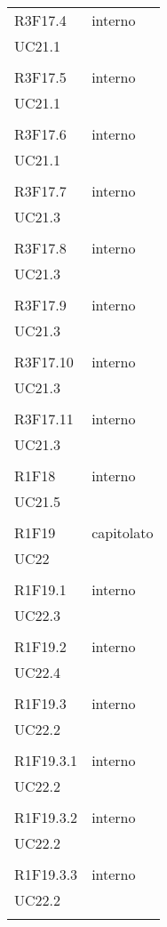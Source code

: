 \begin{longtable}{ >{\centering}p{}
		>{\centering}p{}}
	R3F17.4 & interno\\UC21.1\\\tabularnewline
	
	R3F17.5 & interno\\UC21.1\\\tabularnewline
	
	R3F17.6 & interno\\UC21.1\\\tabularnewline
	
	R3F17.7 & interno\\UC21.3\\\tabularnewline
	
	R3F17.8 & interno\\UC21.3\\\tabularnewline
	
	R3F17.9 & interno\\UC21.3\\\tabularnewline
	
	R3F17.10 & interno\\UC21.3\\\tabularnewline
	
	R3F17.11 & interno\\UC21.3\\\tabularnewline
	
	R1F18 & interno\\UC21.5\\\tabularnewline
	
	R1F19 & capitolato\\UC22\\\tabularnewline
	
	R1F19.1 & interno\\UC22.3\\\tabularnewline
	
	R1F19.2 & interno\\UC22.4\\\tabularnewline
	
	R1F19.3 & interno\\UC22.2\\\tabularnewline
	
	R1F19.3.1 & interno\\UC22.2\\\tabularnewline
	
	R1F19.3.2 & interno\\UC22.2\\\tabularnewline
	
	R1F19.3.3 & interno\\UC22.2\\\tabularnewline
	

\end{longtable}

